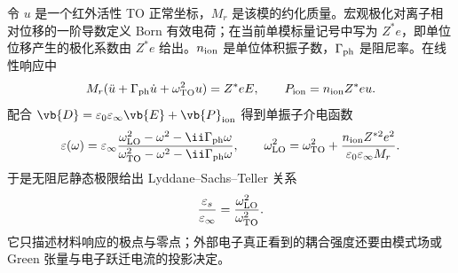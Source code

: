 令 $u$ 是一个红外活性 TO 正常坐标，$M_r$ 是该模的约化质量。宏观极化对离子相对位移的一阶导数定义 Born 有效电荷；在当前单模标量记号中写为 $Z^*e$，即单位位移产生的极化系数由 $Z^*e$ 给出。$n_{\rm ion}$ 是单位体积振子数，$\Gamma_{\rm ph}$ 是阻尼率。在线性响应中
\begin{equation}
{
M_r(\ddot u+\Gamma_{\rm ph}\dot u+\omega_{\rm TO}^2u)=Z^*eE,
\qquad
P_{\rm ion}=n_{\rm ion}Z^*eu.}
\label{eq:polar-optical-oscillator-eom-dp76}
\end{equation}
配合 $\vb{D}=\varepsilon_0\varepsilon_\infty\vb{E}+\vb{P}_{\rm ion}$ 得到单振子介电函数
\begin{equation}
{
\varepsilon(\omega)
=\varepsilon_\infty
\frac{\omega_{\rm LO}^2-\omega^2-\ii\Gamma_{\rm ph}\omega}
{\omega_{\rm TO}^2-\omega^2-\ii\Gamma_{\rm ph}\omega},
\qquad
\omega_{\rm LO}^2
=\omega_{\rm TO}^2+
\frac{n_{\rm ion}Z^{*2}e^2}{\varepsilon_0\varepsilon_\infty M_r}.}
\label{eq:polar_optical_dielectric_response}
\end{equation}
于是无阻尼静态极限给出 Lyddane--Sachs--Teller 关系
\begin{equation}
{
\frac{\varepsilon_s}{\varepsilon_\infty}
=\frac{\omega_{\rm LO}^2}{\omega_{\rm TO}^2}.}
\label{eq:lattice_lst_relation}
\end{equation}
它只描述材料响应的极点与零点；外部电子真正看到的耦合强度还要由模式场或 Green 张量与电子跃迁电流的投影决定。

